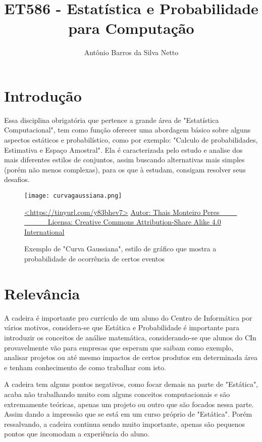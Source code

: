 \documentclass[10pt]{extarticle}
\title{ET586 - Estatística e Probabilidade para Computação}
\author{Antônio Barros da Silva Netto}
\begin{document}
\maketitle

\section{Introdução}

\hspace{\parindent}Essa disciplina obrigatória que pertence a grande área de "Estatística Computacional", tem como função oferecer uma abordagem básico sobre alguns aspectos estáticos e probabilístico, como por exemplo: "Calculo de probabilidades, Estimativa e Espaço Amostral". Ela é caracterizada pelo estudo e analise dos mais diferentes estilos de conjuntos, assim buscando alternativas mais simples (porém não menos complexas), para os que à estudam, consigam resolver seus desafios.

\begin{figure}[h!]
\centering
\texttt{[image: curvagaussiana.png]}
\caption{Exemplo de "Curva Gaussiana", estilo de gráfico que mostra a probabilidade de ocorrência de certos eventos}
\url{<https://tinyurl.com/y83bhev7>}
\href{https://tinyurl.com/y83bhev7}{Autor: Thais Monteiro Peres ~ ~ ~ ~ ~ ~ ~ Licensa: Creative Commons Attribution-Share Alike 4.0 International}
\label{fig:curvagaussiana}
\end{figure}

\section{Relevância}

\hspace{\parindent}A cadeira é importante pro currículo de um aluno do Centro de Informática por vários motivos, considera-se que Estática e Probabilidade é importante para introduzir os conceitos de análise matemática, considerando-se que alunos do CIn provavelmente vão para empresas que esperam que saibam como exemplo, analisar projetos ou até mesmo impactos de certos produtos em determinada área e tenham conhecimento de como trabalhar com isto.

A cadeira tem alguns pontos negativos, como focar demais na parte de "Estática", acaba não trabalhando muito com alguns conceitos computacionais e são extremamente teóricas, apenas um projeto ou outro que são focados nessa parte. Assim dando a impressão que se está em um curso próprio de "Estática". Porém ressalvando, a cadeira continua sendo muito importante, apenas são pequenos pontos que incomodam a experiência do aluno.
\end{document}
